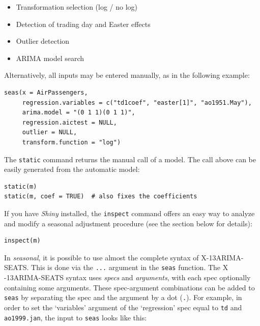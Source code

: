 \begin{itemize}
\itemsep1pt\parskip0pt
\item
  Transformation selection (log / no log)
\item
  Detection of trading day and Easter effects
\item
  Outlier detection
\item
  ARIMA model search
\end{itemize}

Alternatively, all inputs may be entered manually, as in the following
example:

\begin{verbatim}
seas(x = AirPassengers, 
     regression.variables = c("td1coef", "easter[1]", "ao1951.May"), 
     arima.model = "(0 1 1)(0 1 1)", 
     regression.aictest = NULL,
     outlier = NULL, 
     transform.function = "log")
\end{verbatim}

The \texttt{static} command returns the manual call of a model. The call
above can be easily generated from the automatic model:

\begin{verbatim}
static(m)
static(m, coef = TRUE)  # also fixes the coefficients
\end{verbatim}

If you have \emph{Shiny} installed, the \texttt{inspect} command offers
an easy way to analyze and modify a seasonal adjustment procedure (see
the section below for details):

\begin{verbatim}
inspect(m)
\end{verbatim}


In \emph{seasonal}, it is possible to use almost the complete syntax of
X-13ARIMA- SEATS. This is done via the \texttt{...} argument in the
\texttt{seas} function. The X -13ARIMA-SEATS syntax uses \emph{specs}
and \emph{arguments}, with each spec optionally containing some
arguments. These spec-argument combinations can be added to
\texttt{seas} by separating the spec and the argument by a dot
(\texttt{.}). For example, in order to set the `variables' argument of
the `regression' spec equal to \texttt{td} and \texttt{ao1999.jan}, the
input to \texttt{seas} looks like this:

